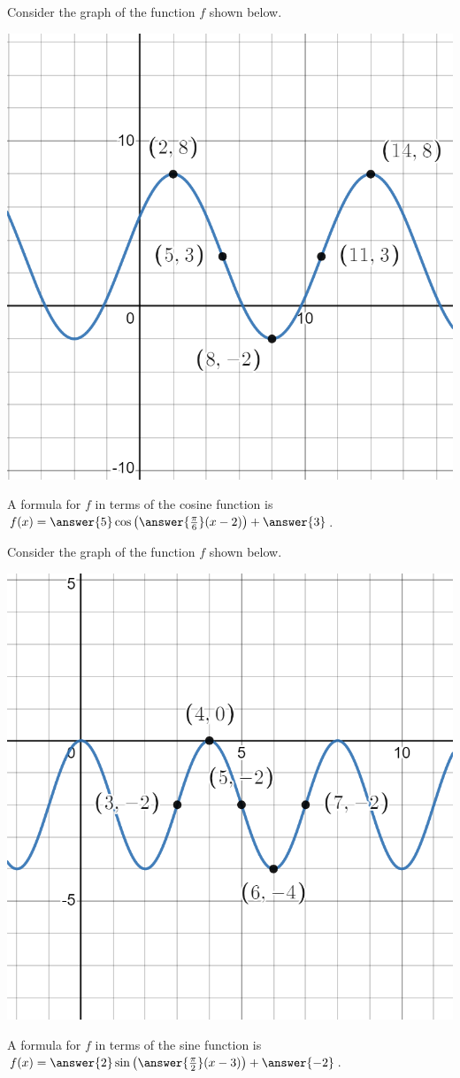 \documentclass{ximera}
\author{Kenneth Berglund}
\begin{document}
\begin{exercise}
Consider the graph of the function $f$ shown below. 

\begin{image}
\includegraphics[width=0.8\linewidth]{TF9-graph.png}
\end{image}

A formula for $f$ in terms of the cosine function is $f(x) = \answer{5}\cos\left(\answer{\frac{\pi}{6}}(x - 2)\right) + \answer{3}$. 
\end{exercise} 

\begin{exercise}
Consider the graph of the function $f$ shown below. 

\begin{image}
\includegraphics[width=0.8\linewidth]{TF9-graph-2.png}
\end{image}

A formula for $f$ in terms of the sine function is $f(x) = \answer{2}\sin\left(\answer{\frac{\pi}{2}}(x - 3)\right) + \answer{-2}$. 
\end{exercise} 
\end{document}
